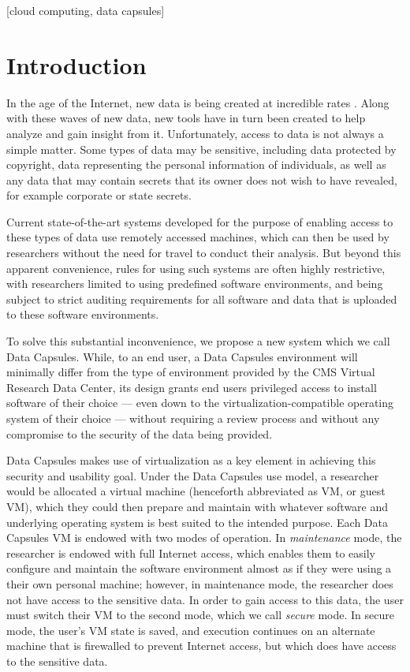 \documentclass{acm_proc_article-sp}
\begin{document}
[cloud computing, data capsules]


\section{Introduction}

In the age of the Internet, new data is being created at incredible rates
\cite{digital-universe}.  Along with these waves of new data, new tools have
in turn been created to help analyze and gain insight from it. Unfortunately,
access to data is not always a simple matter.  Some types of data may be
sensitive, including data protected by copyright, data representing the personal
information of individuals, as well as any data that may contain secrets that
its owner does not wish to have revealed, for example corporate or state secrets.

Current state-of-the-art systems developed for the purpose of enabling access to
these types of data use remotely accessed machines, which can then be used by
researchers without the need for travel to conduct their analysis. But beyond
this apparent convenience, rules for using such systems are often highly
restrictive, with researchers limited to using predefined software environments,
and being subject to strict auditing requirements for all software and data that
is uploaded to these software environments.  

To solve this substantial inconvenience, we propose a new system which we call
Data Capsules.  While, to an end user, a Data Capsules environment will
minimally differ from the type of environment provided by the CMS Virtual
Research Data Center, its design grants end users privileged access to install
software of their choice --- even down to the virtualization-compatible
operating system of their choice --- without requiring a review process and
without any compromise to the security of the data being provided.

Data Capsules makes use of virtualization as a key element in achieving this
security and usability goal.  Under the Data Capsules use model, a researcher
would be allocated a virtual machine (henceforth abbreviated as VM, or guest
VM), which they could then prepare and maintain with whatever software and
underlying operating system is best suited to the intended purpose.  Each Data
Capsules VM is endowed with two modes of operation.  In \emph{maintenance} mode,
the researcher is endowed with full Internet access, which enables them to
easily configure and maintain the software environment almost as if they were
using a their own personal machine; however, in maintenance mode, the researcher
does not have access to the sensitive data.  In order to gain access to this
data, the user must switch their VM to the second mode, which we call
\emph{secure} mode.  In secure mode, the user's VM state is saved, and
execution continues on an alternate machine that is firewalled to prevent
Internet access, but which does have access to the sensitive data.
\end{document}
